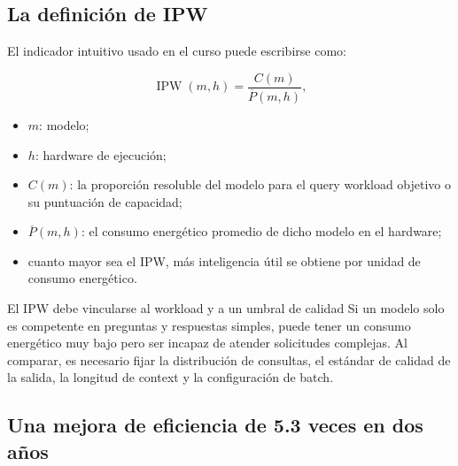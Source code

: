 \subsection{La definición de IPW}


El indicador intuitivo usado en el curso puede escribirse como:

$$
\operatorname{IPW}(m,h)=
\frac{C(m)}{\overline P(m,h)},
$$

\begin{itemize}
    \item $m$: modelo;
    \item $h$: hardware de ejecución;
    \item $C(m)$: la proporción resoluble del modelo para el query workload objetivo o su puntuación de capacidad;
    \item $\overline P(m,h)$: el consumo energético promedio de dicho modelo en el hardware;
    \item cuanto mayor sea el IPW, más inteligencia útil se obtiene por unidad de consumo energético.
\end{itemize}


\begin{warningbox}{El IPW debe vincularse al workload y a un umbral de calidad}
Si un modelo solo es competente en preguntas y respuestas simples, puede tener un consumo energético muy bajo pero ser incapaz de atender solicitudes complejas. Al comparar, es necesario fijar la distribución de consultas, el estándar de calidad de la salida, la longitud de context y la configuración de batch.
\end{warningbox}

\subsection{Una mejora de eficiencia de 5.3 veces en dos años}


